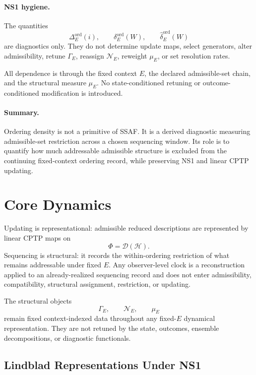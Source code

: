 \documentclass[aps,prx,onecolumn,11pt]{revtex4-2}
\theoremstyle{plain}
\theoremstyle{definition}
\theoremstyle{remark}
\begin{document}
\paragraph{NS1 hygiene.}

The quantities
\[
\Delta_E^{\mathrm{ord}}(i),
\qquad
\delta_E^{\mathrm{ord}}(W),
\qquad
\widehat{\delta}_E^{\mathrm{ord}}(W)
\]
are diagnostics only. They do not determine update maps, select
generators, alter admissibility, retune \(\Gamma_E\), reassign
\(\mathcal N_E\), reweight \(\mu_E\), or set resolution rates.

All dependence is through the fixed context \(E\), the declared
admissible-set chain, and the structural measure \(\mu_E\). No
state-conditioned retuning or outcome-conditioned modification is
introduced.

\paragraph{Summary.}

Ordering density is not a primitive of SSAF. It is a derived diagnostic
measuring admissible-set restriction across a chosen sequencing window.
Its role is to quantify how much addressable admissible structure is
excluded from the continuing fixed-context ordering record, while
preserving NS1 and linear CPTP updating.

\section{Core Dynamics}
\label{sec:core_dynamics}

Updating is representational: admissible reduced descriptions are
represented by linear CPTP maps on
\[
\Phi=\mathcal{D}(\mathcal{H}).
\]
Sequencing is structural: it records the within-ordering restriction of
what remains addressable under fixed \(E\). Any observer-level clock is
a reconstruction applied to an already-realized sequencing record and
does not enter admissibility, compatibility, structural assignment,
restriction, or updating.

The structural objects
\[
\Gamma_E,
\qquad
\mathcal N_E,
\qquad
\mu_E
\]
remain fixed context-indexed data throughout any fixed-\(E\) dynamical
representation. They are not retuned by the state, outcomes, ensemble
decompositions, or diagnostic functionals.

\subsection{Lindblad Representations Under NS1}
\label{subsec:cd_lindblad_ns1}
\end{document}
